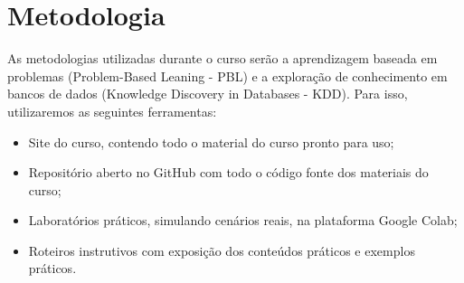 \section{Metodologia}
As metodologias utilizadas durante o curso serão a aprendizagem baseada em problemas (Problem-Based Leaning - PBL) e a exploração de conhecimento em bancos de dados (Knowledge Discovery in Databases - KDD). Para isso, utilizaremos as seguintes ferramentas:

\begin{itemize}
	\item Site do curso, contendo todo o material do curso pronto para uso;
	\item Repositório aberto no GitHub com todo o código fonte dos materiais do curso;
	\item Laboratórios práticos, simulando cenários reais, na plataforma Google Colab;
	\item Roteiros instrutivos com exposição dos conteúdos práticos e exemplos práticos.
\end{itemize}
